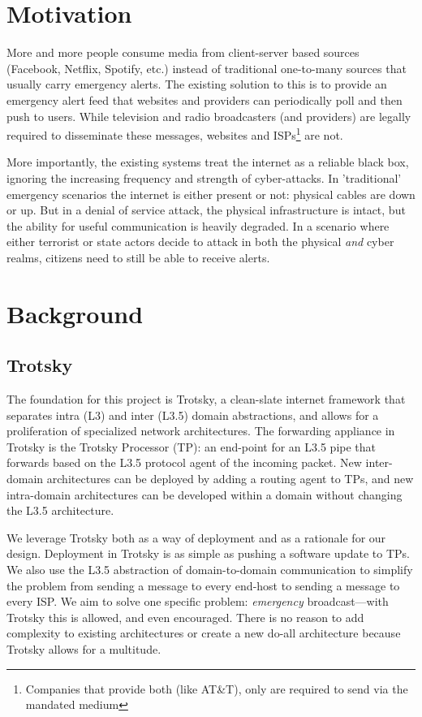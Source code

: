 \section{Motivation}

More and more people consume media from client-server based sources (Facebook, Netflix, Spotify, etc.) instead of traditional one-to-many sources that usually carry emergency alerts. The existing solution to this is to provide an emergency alert feed that websites and providers can periodically poll and then push to users. While television and radio broadcasters (and providers) are legally required to disseminate these messages, websites and ISPs\footnote{Companies that provide both (like AT\&T), only are required to send via the mandated medium} are not\cite{cfr47}.

More importantly, the existing systems treat the internet as a reliable black box, ignoring the increasing frequency and strength of cyber-attacks. In 'traditional' emergency scenarios the internet is either present or not: physical cables are down or up. But in a denial of service attack, the physical infrastructure is intact, but the ability for useful communication is heavily degraded. In a scenario where either terrorist or state actors decide to attack in both the physical \textit{and} cyber realms, citizens need to still be able to receive alerts.

\section{Background}
\subsection{Trotsky}
The foundation for this project is Trotsky, a clean-slate internet framework that separates intra (L3) and inter (L3.5) domain abstractions, and allows for a proliferation of specialized network architectures. The forwarding appliance in Trotsky is the Trotsky Processor (TP): an end-point for an L3.5 pipe that forwards based on the L3.5 protocol agent of the incoming packet. New inter-domain architectures can be deployed by adding a routing agent to TPs, and new intra-domain architectures can be developed within a domain without changing the L3.5 architecture.

We leverage Trotsky both as a way of deployment and as a rationale for our design. Deployment in Trotsky is as simple as pushing a software update to TPs. We also use the L3.5 abstraction of domain-to-domain communication to simplify the problem from sending a message to every end-host to sending a message to every ISP. We aim to solve one specific problem: \textit{emergency} broadcast---with Trotsky this is allowed, and even encouraged. There is no reason to add complexity to existing architectures or create a new do-all architecture because Trotsky allows for a multitude. 

